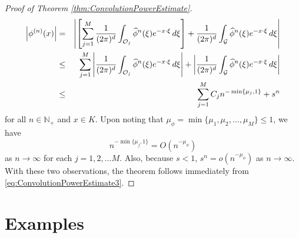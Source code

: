 \documentclass[11pt]{article}
\theoremstyle{remark}
\newcommand{\lb}{\left[}
\newcommand{\rb}{\right]}
\begin{document}
\begin{proof}[Proof of Theorem \ref{thm:ConvolutionPowerEstimate}]
\begin{eqnarray}\label{eq:ConvolutionPowerEstimate3}\nonumber
    \abs{\phi^{(n)}(x)}
    &=&\abs{\lb \sum_{j=1}^M\frac{1}{(2\pi)^d}\int_{\mathcal{O}_j}\widehat{\phi}^n(\xi)e^{-x\cdot\xi}\,d\xi \rb
    +\frac{1}{(2\pi)^d}\int_{\mathcal{G}}\widehat{\phi}^n(\xi)e^{-x\cdot\xi}\,d\xi}\\\nonumber
    &\leq&\sum_{j=1}^M\abs{\frac{1}{(2\pi)^d}\int_{\mathcal{O}_j}\widehat{\phi}^n(\xi)e^{-x\cdot\xi}\,d\xi}+\abs{\frac{1}{(2\pi)^d}\int_{\mathcal{G}}\widehat{\phi}^n(\xi)e^{-x\cdot\xi}\,d\xi}\\
    &\leq&\sum_{j=1}^M C_jn^{-\min\{\mu_j,1\}}+s^n
\end{eqnarray}
for all $n\in\mathbb{N}_+$ and $x\in K$. Upon noting that $\mu_\phi=\min\{\mu_1,\mu_2,\dots,\mu_M\}\leq 1$, we have
\begin{equation*}
    n^{-\min\{\mu_j,1\}}=O(n^{-\mu_\phi})
\end{equation*}
as $n\to\infty$ for each $j=1,2,\dots M$. Also, because $s<1$, $s^n=o(n^{-\mu_\phi})$ as $n\to \infty$. With these two observations, the theorem follows immediately from \eqref{eq:ConvolutionPowerEstimate3}.
\end{proof}


\section{Examples}

\end{document}
